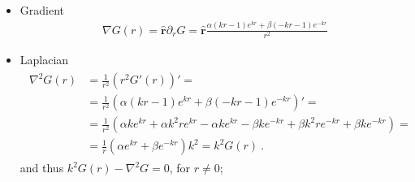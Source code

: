 \documentclass[letterpaper,10pt,english]{jupyterBook}
\begin{document}
\begin{itemize}
\item {} 
\sphinxAtStartPar
Gradient
\begin{equation*}
\begin{split}\nabla G(r) = \hat{\mathbf{r}} \partial_r G = \hat{\mathbf{r}} \frac{\alpha (k r - 1) e^{kr} + \beta(-k r - 1)e^{-kr}}{r^2}\end{split}
\end{equation*}
\item {} 
\sphinxAtStartPar
Laplacian
\begin{equation*}
\begin{split}\begin{aligned}
    \nabla^2 G(r) & = \frac{1}{r^2} \left( r^2 G'(r) \right)' = \\
    & = \frac{1}{r^2} \left(  \alpha (k r - 1) e^{kr} + \beta(-k r - 1)e^{-kr}\right)' = \\
    & = \frac{1}{r^2} \left( \alpha k e^{kr} + \alpha k^2 r  e^{kr} - \alpha k e^{kr} - \beta k e^{-kr} + \beta k^2 r e^{-kr} + \beta k e^{-kr}  \right) = \\
    & = \frac{1}{r} \left( \alpha e^{kr} + \beta e^{-kr} \right) k^2 = k^2 G(r) \ .
  \end{aligned}\end{split}
\end{equation*}
\sphinxAtStartPar
and thus \(k^2 G(r) - \nabla^2 G = 0\), for \(r \ne 0\);


\end{itemize}
\end{document}
